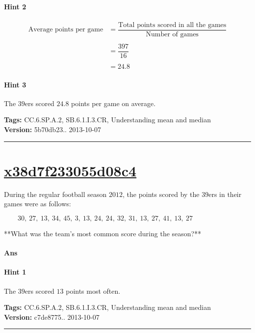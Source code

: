 \documentclass[twocolumn,10pt]{article}
\begin{document}
\paragraph{Hint 2}\begin{align*}\text{Average points per game} &= \dfrac{\text{Total points scored in all the games}}{\text{Number of games}}\\ 
\\
&= \dfrac{397}{16}\\
\\
&=24.8\end{align*}


\paragraph{Hint 3}The $39$ers scored $24.8$ points per game on average.



\medskip
\noindent
\textbf{Tags:} {\footnotesize CC.6.SP.A.2, SB.6.1.I.3.CR, Understanding mean and median}\\
\textbf{Version:} 5b70db23.. 2013-10-07
\smallskip\hrule





\section{\href{https://www.khanacademy.org/devadmin/content/items/x38d7f233055d08c4}{x38d7f233055d08c4}}

\noindent
During the regular football season $2012$, the points scored by the $39$ers in their games were as follows:

$\qquad30,~27,~13,~34,~45,~3,~13,~24,~24,~32,~31,~13,~27,~41,~13,~27$

**What was the team's most common score during the season?**

\paragraph{Ans} 

\paragraph{Hint 1}The $39$ers scored $13$ points most often.



\medskip
\noindent
\textbf{Tags:} {\footnotesize CC.6.SP.A.2, SB.6.1.I.3.CR, Understanding mean and median}\\
\textbf{Version:} c7de8775.. 2013-10-07
\smallskip\hrule
\end{document}
